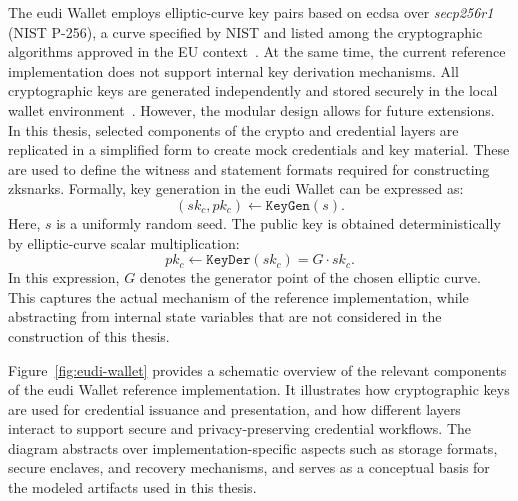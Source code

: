 The \acrshort{eudi} Wallet employs elliptic-curve key pairs based on \acrshort{ecdsa} over \emph{secp256r1} (NIST P-256), a curve specified by NIST and listed among the cryptographic algorithms approved in the EU context~\cite{NIST-SP-800-186,SOGIS-ACM-1.3}. At the same time, the current reference implementation does not support internal key derivation mechanisms. All cryptographic keys are generated independently and stored securely in the local wallet environment~\cite{EUDI-ARF}. However, the modular design allows for future extensions. In this thesis, selected components of the crypto and credential layers are replicated in a simplified form to create mock credentials and key material. These are used to define the witness and statement formats required for constructing \acrshort{zksnark}s. Formally, key generation in the \acrshort{eudi} Wallet can be expressed as:
\[
(sk_c, pk_c) \leftarrow \texttt{KeyGen}(s).
\]
Here, $s$ is a uniformly random seed. The public key is obtained deterministically by elliptic-curve scalar multiplication:
\[
pk_c \leftarrow \texttt{KeyDer}(sk_c) = G \cdot sk_c.
\]
In this expression, $G$ denotes the generator point of the chosen elliptic curve. This captures the actual mechanism of the reference implementation, while abstracting from internal state variables that are not considered in the construction of this thesis.

Figure~\ref{fig:eudi-wallet} provides a schematic overview of the relevant components of the \acrshort{eudi} Wallet reference implementation. It illustrates how cryptographic keys are used for credential issuance and presentation, and how different layers interact to support secure and privacy-preserving credential workflows. The diagram abstracts over implementation-specific aspects such as storage formats, secure enclaves, and recovery mechanisms, and serves as a conceptual basis for the modeled artifacts used in this thesis.

\EudiFigure

